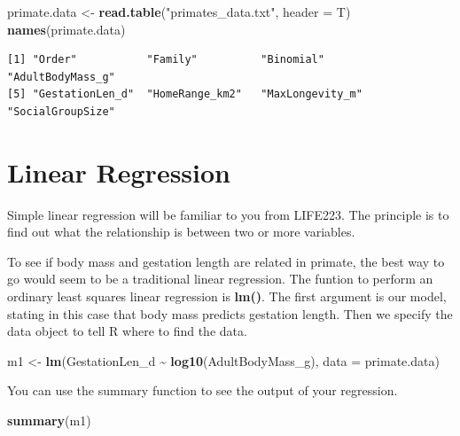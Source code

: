 \documentclass[
]{book}
\newenvironment{Shaded}{\begin{snugshade}}{\end{snugshade}}
\newcommand{\DataTypeTok}[1]{\textcolor[rgb]{0.13,0.29,0.53}{#1}}
\newcommand{\KeywordTok}[1]{\textcolor[rgb]{0.13,0.29,0.53}{\textbf{#1}}}
\newcommand{\NormalTok}[1]{#1}
\newcommand{\OperatorTok}[1]{\textcolor[rgb]{0.81,0.36,0.00}{\textbf{#1}}}
\newcommand{\StringTok}[1]{\textcolor[rgb]{0.31,0.60,0.02}{#1}}
\begin{document}
\begin{Shaded}
\begin{Highlighting}[]
\NormalTok{primate.data \textless{}{-}}\StringTok{ }\KeywordTok{read.table}\NormalTok{(}\StringTok{"primates\_data.txt"}\NormalTok{, }\DataTypeTok{header =}\NormalTok{ T)}
\KeywordTok{names}\NormalTok{(primate.data)}
\end{Highlighting}
\end{Shaded}

\begin{verbatim}
[1] "Order"           "Family"          "Binomial"        "AdultBodyMass_g"
[5] "GestationLen_d"  "HomeRange_km2"   "MaxLongevity_m"  "SocialGroupSize"
\end{verbatim}

\hypertarget{linear-regression}{%
\section{Linear Regression}\label{linear-regression}}

Simple linear regression will be familiar to you from LIFE223. The principle is to find out what the relationship is between two or more variables.

To see if body mass and gestation length are related in primate, the best way to go would seem to be a traditional linear regression. The funtion to perform an ordinary least squares linear regression is \textbf{lm()}. The first argument is our model, stating in this case that body mass predicts gestation length. Then we specify the data object to tell R where to find the data.

\begin{Shaded}
\begin{Highlighting}[]
\NormalTok{m1 \textless{}{-}}\StringTok{ }\KeywordTok{lm}\NormalTok{(GestationLen\_d }\OperatorTok{\textasciitilde{}}\StringTok{ }\KeywordTok{log10}\NormalTok{(AdultBodyMass\_g), }\DataTypeTok{data =}\NormalTok{ primate.data)}
\end{Highlighting}
\end{Shaded}

You can use the summary function to see the output of your regression.

\begin{Shaded}
\begin{Highlighting}[]
\KeywordTok{summary}\NormalTok{(m1)}
\end{Highlighting}
\end{Shaded}
\end{document}
